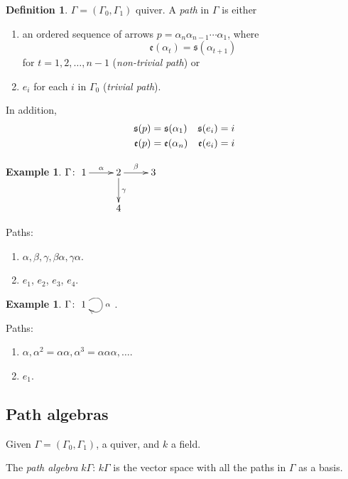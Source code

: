 \documentclass{amsart}
\numberwithin{equation}{section}
\theoremstyle{definition}
\newtheorem{defin}[thm]{Definition}
\newtheorem{exam}[thm]{Example}
\newcommand{\G}{\Gamma}
\begin{document}
\begin{defin}
$\G=(\G_0,\G_1)$ quiver.  A \emph{path} in $\G$ is either
\begin{enumerate}[\rm(i)]
\item an ordered sequence of arrows $p=\alpha_n\alpha_{n-1}\cdots\alpha_1$, where 
\[\mathfrak{e}(\alpha_t) = \mathfrak{s}(\alpha_{t+1})\]
for $t = 1,2,\ldots,n-1$ (\emph{non-trivial path}) or
\item $e_i$ for each $i$ in $\G_0$ (\emph{trivial path}).
\end{enumerate}
In addition,
\begin{align}
\mathfrak{s}(p) & = \mathfrak{s}(\alpha_1)  & \mathfrak{s}(e_i) = i\notag\\
\mathfrak{e}(p) & = \mathfrak{e}(\alpha_n)  & \mathfrak{e}(e_i) = i\notag
\end{align}
\end{defin}

\begin{exam}\label{exam:1.6}
$\G\colon \xymatrix{ 1\ar[r]^\alpha & 2 \ar[r]^\beta\ar[d]^\gamma & 3\\
& 4 & }$

Paths: 
\begin{enumerate}[\rm(i)]
\item $\alpha, \beta, \gamma, \beta\alpha, \gamma\alpha$.
\item $e_1$, $e_2$, $e_3$, $e_4$.
\end{enumerate}
\end{exam}

\begin{exam}
$\G\colon \xymatrix{1\ar@(ur,dr)[]^\alpha}$.

Paths: 
\begin{enumerate}[\rm(i)]
\item $\alpha, \alpha^2 = \alpha\alpha, \alpha^3 = \alpha\alpha\alpha, \ldots$.
\item $e_1$.
\end{enumerate}
\end{exam}

\subsection{Path algebras}

Given $\G=(\G_0,\G_1)$, a quiver, and $k$ a field.

The \emph{path algebra} $k\G$:  $k\G$ is the
vector space with all the paths in $\G$ as a basis. 
\end{document}
